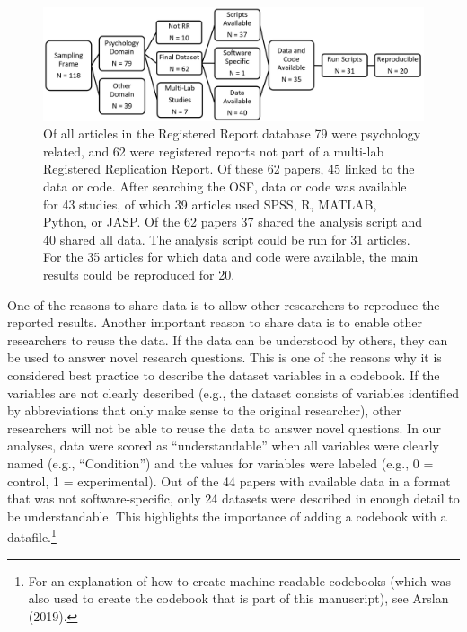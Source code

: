 \documentclass[,jou, a4paper,floatsintext]{apa6}
\let\rmarkdownfootnote\footnote%
\def\footnote{\protect\rmarkdownfootnote}
\begin{document}
\begin{figure}
\begin{center}
\includegraphics[width=\textwidth]{fig1.png}

\caption{Of all articles in the Registered Report database 79 were psychology related, and 62 were registered reports not part of a multi-lab Registered Replication Report. Of these 62 papers, 45 linked to the data or code. After searching the OSF, data or code was available for 43 studies, of which 39 articles used SPSS, R, MATLAB, Python, or JASP. Of the 62 papers 37 shared the analysis script and 40 shared all data. The analysis script could be run for 31 articles. For the 35 articles for which data and code were available, the main results could be reproduced for 20. 
}

\label{fig:fig1}
\end{center}
\end{figure}

One of the reasons to share data is to allow other researchers to reproduce the reported results. Another important reason to share data is to enable other researchers to reuse the data. If the data can be understood by others, they can be used to answer novel research questions. This is one of the reasons why it is considered best practice to describe the dataset variables in a codebook. If the variables are not clearly described (e.g., the dataset consists of variables identified by abbreviations that only make sense to the original researcher), other researchers will not be able to reuse the data to answer novel questions. In our analyses, data were scored as \enquote{understandable} when all variables were clearly named (e.g., \enquote{Condition}) and the values for variables were labeled (e.g., 0 = control, 1 = experimental). Out of the 44 papers with available data in a format that was not software-specific, only 24 datasets were described in enough detail to be understandable. This highlights the importance of adding a codebook with a datafile.\footnote{For an explanation of how to create machine-readable codebooks (which was also used to create the codebook that is part of this manuscript), see Arslan (2019).}
\end{document}
